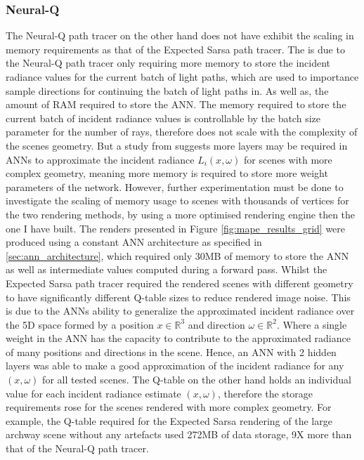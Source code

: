 \documentclass[../dissertation.tex]{subfiles}
\begin{document}

\subsubsection{Neural-Q}

The Neural-Q path tracer on the other hand does not have exhibit the scaling in memory requirements as that of the Expected Sarsa path tracer. The is due to the Neural-Q path tracer only requiring more memory to store the incident radiance values for the current batch of light paths, which are used to importance sample directions for continuing the batch of light paths in. As well as, the amount of RAM required to store the ANN. The memory required to store the current batch of incident radiance values is controllable by the batch size parameter for the number of rays, therefore does not scale with the complexity of the scenes geometry. But a study from \cite{ren2013global} suggests more layers may be required in ANNs to approximate the incident radiance $L_i(x, \omega)$ for scenes with more complex geometry, meaning more memory is required to store more weight parameters of the network. However, further experimentation must be done to investigate the scaling of memory usage to scenes with thousands of vertices for the two rendering methods, by using a more optimised rendering engine then the one I have built. The renders presented in Figure \ref{fig:mape_results_grid} were produced using a constant ANN architecture as specified in \ref{sec:ann_architecture}, which required only 30MB of memory to store the ANN as well as intermediate values computed during a forward pass. Whilst the Expected Sarsa path tracer required the rendered scenes with different geometry to have significantly different Q-table sizes to reduce rendered image noise. This is due to the ANNs ability to generalize the approximated incident radiance over the 5D space formed by a position $x \in \mathbb{R}^3$ and direction $\omega \in \mathbb{R}^2$. Where a single weight in the ANN has the capacity to contribute to the approximated radiance of many positions and directions in the scene. Hence, an ANN with 2 hidden layers was able to make a good approximation of the incident radiance for any $(x, \omega)$ for all tested scenes. The Q-table on the other hand holds an individual value for each incident radiance estimate $(x,\omega)$, therefore the storage requirements rose for the scenes rendered with more complex geometry. For example, the Q-table required for the Expected Sarsa rendering of the large archway scene without any artefacts used 272MB of data storage, 9X more than that of the Neural-Q path tracer.
\end{document}
